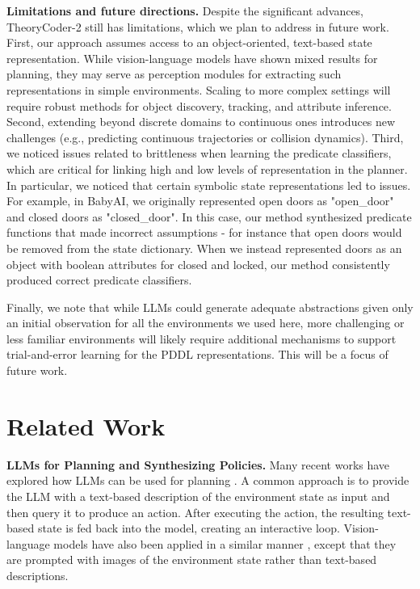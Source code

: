 \documentclass{article}
\theoremstyle{plain}
\theoremstyle{definition}
\theoremstyle{remark}
\begin{document}
\textbf{Limitations and future directions.} Despite the significant advances, TheoryCoder-2 still has limitations, which we plan to address in future work. 
First, our approach assumes access to an object-oriented, text-based state representation. While vision-language models have shown mixed results for planning, they may serve as perception modules for extracting such representations in simple environments. Scaling to more complex settings will require robust methods for object discovery, tracking, and attribute inference. Second, extending beyond discrete domains to continuous ones introduces new challenges (e.g., predicting continuous trajectories or collision dynamics). 
Third, we noticed issues related to brittleness when learning the predicate classifiers, which are critical for linking high and low levels of representation in the planner. In particular, we noticed that certain symbolic state representations led to issues. For example, in BabyAI, we originally represented open doors as "open\_door" and closed doors as "closed\_door". In this case, our method synthesized predicate functions that made incorrect assumptions - for instance that open doors would be removed from the state dictionary. When we instead represented doors as an object with boolean attributes for closed and locked, our method consistently produced correct predicate classifiers. 

Finally, we note that while LLMs could generate adequate abstractions given only an initial observation for all the environments we used here, more challenging or less familiar environments will likely require additional mechanisms to support trial-and-error learning for the PDDL representations. This will be a focus of future work.

\section{Related Work}
\label{sec:related_work}

\textbf{LLMs for Planning and Synthesizing Policies.} Many recent works have explored how LLMs can be used for planning \citep{yao2023react, hao2023reasoning, zhao2024large, liu2023reason,wang2023voyager}. A common approach is to provide the LLM with a text-based description of the environment state as input and then query it to produce an action. After executing the action, the resulting text-based state is fed back into the model, creating an interactive loop. Vision-language models have also been applied in a similar manner \citep{waytowich2024atari, paglieri2024balrog, ruoss2025lmact, cloos2024baba}, except that they are prompted with images of the environment state rather than text-based descriptions.
\end{document}
